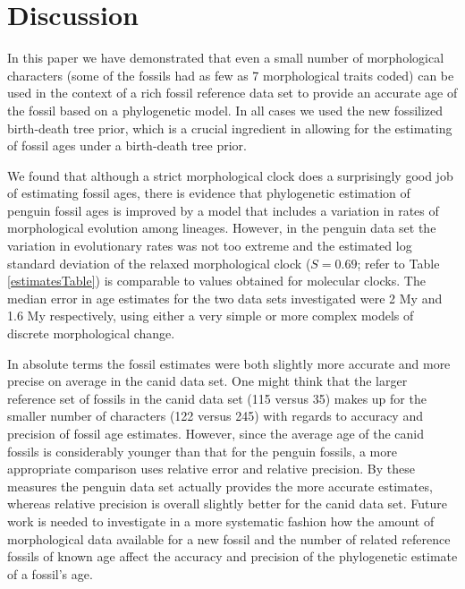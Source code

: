 \documentclass[11pt]{article}
\begin{document}
\section*{Discussion}

In this paper we have demonstrated that even a small number of morphological characters (some of the fossils had as few as 7 morphological traits coded) can be used in the context of a rich fossil reference data set to provide an accurate age of the fossil based on a phylogenetic model. 
In all cases we used the new fossilized birth-death tree prior, which is a crucial ingredient in allowing for the estimating of fossil ages under a birth-death tree prior. 

We found that although a strict morphological clock does a surprisingly good job of estimating fossil ages, there is evidence that phylogenetic estimation of penguin fossil ages is improved by a model that includes a variation in rates of morphological evolution among lineages. 
However, in the penguin data set the variation in evolutionary rates was not too extreme and the estimated log standard deviation of the relaxed morphological clock ($S = 0.69$; refer to Table \ref{estimatesTable}) is comparable to values obtained for molecular clocks.   
The median error in age estimates for the two data sets investigated were 2 My and 1.6 My respectively, using either a very simple or more complex models of discrete morphological change. 

In absolute terms the fossil estimates were both slightly more accurate and more precise on average in the canid data set. 
One might think that the larger reference set of fossils in the canid data set (115 versus 35) makes up for the smaller number of characters (122 versus 245) with regards to accuracy and precision of fossil age estimates. 
However, since the average age of the canid fossils is considerably younger than that for the penguin fossils, a more appropriate comparison uses relative error and relative precision. 
By these measures the penguin data set actually provides the more accurate estimates, whereas relative precision is overall slightly better for the canid data set. Future work is needed to investigate in a more systematic fashion how the amount of morphological data available for a new fossil and the number of related reference fossils of known age affect the accuracy and precision of the phylogenetic estimate of a fossil's age.
\end{document}
